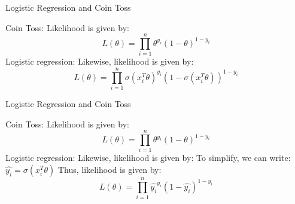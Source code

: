 \documentclass{beamer}
\begin{document}
        
        
    


        
        
        
    



\begin{frame}{Logistic Regression and Coin Toss}

    Coin Toss: Likelihood is given by:
    $$L(\theta) = \prod_{i=1}^n \theta^{y_i}(1-\theta)^{1-y_i}$$
    \vspace{10pt}
    \pause 
    Logistic regression: Likewise, likelihood is given by:
    $$L(\theta) = \prod_{i=1}^n \sigma(x_i^T\theta)^{y_i}(1-\sigma(x_i^T\theta))^{1-y_i}$$
\end{frame}

\begin{frame}{Logistic Regression and Coin Toss}

    Coin Toss: Likelihood is given by:
    $$L(\theta) = \prod_{i=1}^n \theta^{y_i}(1-\theta)^{1-y_i}$$
    \vspace{10pt}
    \pause 
    Logistic regression: Likewise, likelihood is given by:
    \pause To simplify, we can write: $\hat{y_i} = \sigma(x_i^T\theta)$
    \pause Thus, likelihood is given by:
    $$L(\theta) = \prod_{i=1}^n \hat{y_i}^{y_i}(1-\hat{y_i})^{1-y_i}$$
\end{frame}
\end{document}
